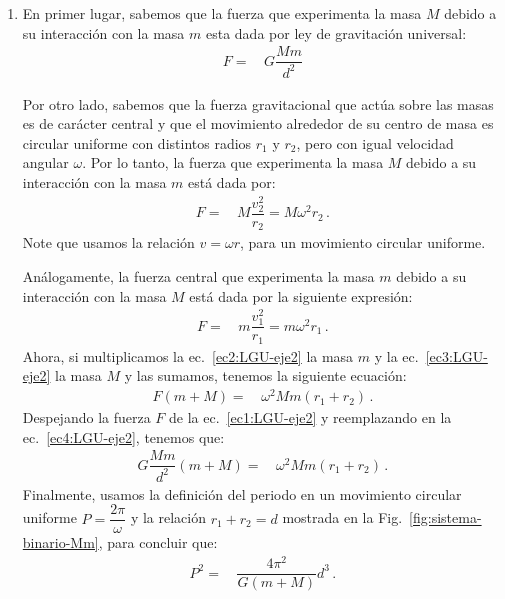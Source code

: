 \begin{enumerate}
\begin{enumerate}
\item En primer lugar,  sabemos que la fuerza que experimenta la masa $M$ debido a su interacción con la masa $m$ esta dada por ley de gravitación universal:
%
\begin{align}
\label{ec1:LGU-eje2}
F=\,&G \dfrac{Mm}{d^2}
\end{align}

Por otro lado, sabemos que la fuerza gravitacional que actúa sobre las masas es de carácter central y que el movimiento alrededor de su centro de masa es circular uniforme con distintos radios $r_1$ y $r_2$, pero con igual velocidad angular $\omega$. 
Por lo tanto, la fuerza que experimenta la masa $M$ debido a su interacción con la masa $m$ está dada por:
%
\begin{align}
\label{ec2:LGU-eje2}
F=\,& M\dfrac{v_2^2}{r_2}=M\omega^2r_2\,.
\end{align}
%
Note que usamos la relación $v=\omega r$, para un movimiento circular uniforme. 

Análogamente, la fuerza central que experimenta la masa $m$ debido a su interacción con la masa $M$ está dada por la siguiente expresión:
%
\begin{align}
\label{ec3:LGU-eje2}
F=\,& m\dfrac{v_1^2}{r_1}=m\omega^2r_1\,.
\end{align}
%
Ahora, si multiplicamos la ec.~\eqref{ec2:LGU-eje2} la masa $m$ y la ec.~\eqref{ec3:LGU-eje2} la masa $M$ y las sumamos, tenemos la siguiente ecuación:
%
\begin{align}
\label{ec4:LGU-eje2}
F(m + M) =\,& \omega^2Mm\left(r_1+r_2\right)\,.
\end{align}
%
Despejando la fuerza $F$ de la ec.~\eqref{ec1:LGU-eje2} y reemplazando en la ec.~\eqref{ec4:LGU-eje2}, tenemos que:
%
\begin{align}
\label{ec5:LGU-eje2}
G\dfrac{Mm}{d^2}(m+M)=\,&\omega^2Mm\left(r_1+r_2\right)\,.
\end{align}
%
Finalmente, usamos la definición del periodo en un movimiento circular uniforme $P=\dfrac{2\pi}{\omega}$ y la relación $r_1+r_2=d$ mostrada en la Fig.~\ref{fig:sistema-binario-Mm}, para concluir que:
%
\begin{align}
\label{ec6:LGU-eje2}
P^2=\,&\dfrac{4\pi^2}{G(m+M)}d^3\,.
\end{align}


\end{enumerate}
\end{enumerate}
